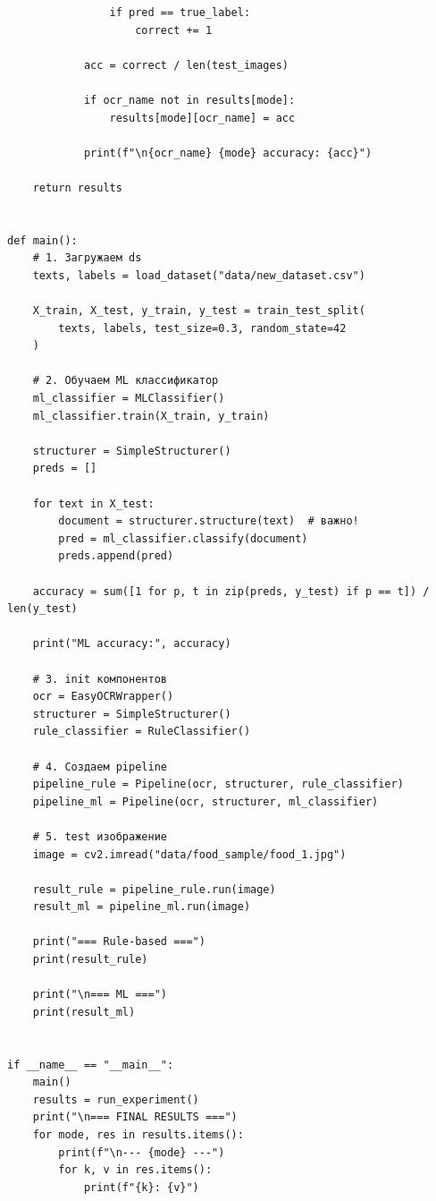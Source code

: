 \documentclass[14pt,a4paper]{extarticle}
\begin{document}
\begin{lstlisting}
                if pred == true_label:
                    correct += 1

            acc = correct / len(test_images)

            if ocr_name not in results[mode]:
                results[mode][ocr_name] = acc

            print(f"\n{ocr_name} {mode} accuracy: {acc}")

    return results


def main():
    # 1. Загружаем ds
    texts, labels = load_dataset("data/new_dataset.csv")

    X_train, X_test, y_train, y_test = train_test_split(
        texts, labels, test_size=0.3, random_state=42
    )

    # 2. Обучаем ML классификатор
    ml_classifier = MLClassifier()
    ml_classifier.train(X_train, y_train)

    structurer = SimpleStructurer()
    preds = []

    for text in X_test:
        document = structurer.structure(text)  # важно!
        pred = ml_classifier.classify(document)
        preds.append(pred)

    accuracy = sum([1 for p, t in zip(preds, y_test) if p == t]) / len(y_test)

    print("ML accuracy:", accuracy)

    # 3. init компонентов
    ocr = EasyOCRWrapper()
    structurer = SimpleStructurer()
    rule_classifier = RuleClassifier()

    # 4. Создаем pipeline 
    pipeline_rule = Pipeline(ocr, structurer, rule_classifier)
    pipeline_ml = Pipeline(ocr, structurer, ml_classifier)

    # 5. test изображение
    image = cv2.imread("data/food_sample/food_1.jpg")

    result_rule = pipeline_rule.run(image)
    result_ml = pipeline_ml.run(image)

    print("=== Rule-based ===")
    print(result_rule)

    print("\n=== ML ===")
    print(result_ml)


if __name__ == "__main__":
    main()
    results = run_experiment()
    print("\n=== FINAL RESULTS ===")
    for mode, res in results.items():
        print(f"\n--- {mode} ---")
        for k, v in res.items():
            print(f"{k}: {v}")
\end{lstlisting}
\end{document}
